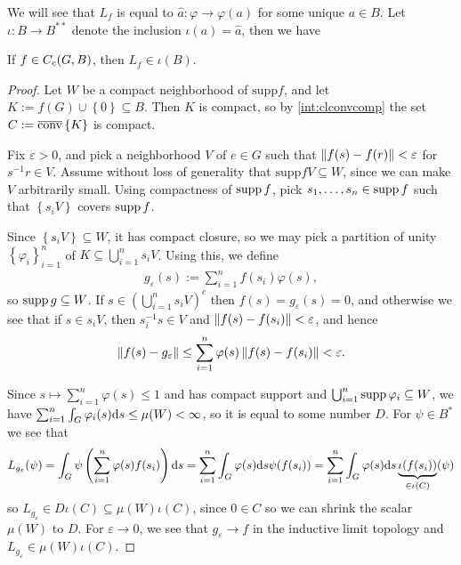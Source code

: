 We will see that $L_f$ is equal to $\hat a \colon \varphi \to \varphi(a)$ for some unique $a \in B$. Let $\iota \colon B \to B^{**}$ denote the inclusion $\iota(a) = \hat a$, then we have
\begin{lemma}
	If $f \in C_c(G,B)$, then $L_f \in \iota(B)$.
	\label{int:defintegral}
\end{lemma}
\begin{proof}
	Let $W$ be a compact neighborhood of $\mathrm{supp} f$, and let $K:= f(G) \cup \left\{ 0 \right\} \subseteq B$. Then $K$ is compact, so by \ref{int:clconvcomp} the set $C := \overline {\operatorname{conv}} \left\{ K \right\}$ is compact.

	Fix $\varepsilon > 0$, and pick a neighborhood $V$ of $e \in G$ such that $ \left\lVert f(s) - f(r) \right\rVert < \varepsilon$ for $s^{-1}r \in V$. Assume without loss of generality that $\mathrm{supp} f V \subseteq W$, since we can make $V$ arbitrarily small. Using compactness of $\operatorname{supp} f$, pick $s_1,\dots,s_n \in \operatorname{supp} f$ such that $\left\{ s_i V \right\}$ covers $\operatorname{supp} f$.
	
	Since $ \left\{ s_i V \right\} \subseteq W$, it has compact closure, so we may pick a partition of unity $\left\{ \varphi_i \right\}_{i=1}^n$ of $ K \subseteq \bigcup_{i=1}^n s_i V$. Using this, we define 
	\begin{align*}
		g_\varepsilon (s) := \sum_{i=1}^n f(s_i) \varphi(s),
	\end{align*}
	so $\operatorname{supp} g \subseteq W$. If $s \in \left( \bigcup_{i=1}^n s_i V \right)^c$ then $f(s) = g_{\varepsilon}(s) = 0$, and otherwise we see that if $s \in s_i V$, then $s_i^{-1}s \in V$ and $\left\lVert f(s) - f(s_i) \right\rVert < \varepsilon$, and hence
	\begin{align*}
		\left\lVert f(s) - g_{\varepsilon} \right\rVert  \leq \sum_{i=1}^n \varphi(s) \left\lVert f(s)-f(s_i) \right\rVert  < \varepsilon.
	\end{align*}

	Since $s \mapsto \sum_{i=1}^n \varphi(s) \leq 1$ and has compact support and $\bigcup_{i=1}^n \operatorname{supp} \varphi_i \subseteq W$, we have $\sum_{i=1}^n \int_G \varphi_i(s) \mathrm{d} s \leq \mu(W) < \infty$, so it is equal to some number $D$. For $\psi \in B^*$ we see that
	\begin{align*}
		L_{g_{\varepsilon}} ( \psi ) = \int_{G} \psi\left( \sum_{i=1}^n \varphi(s) f(s_i) \right) \mathrm{d} s = \sum_{i=1}^n \int_G \varphi(s) \mathrm{d} s \psi(f(s_i)) = \sum_{i=1}^n \int_G \varphi(s) \mathrm{d} s \underbrace{\iota(f(s_i))}_{ \in \iota(C)} (\psi) 
	\end{align*}
	so $L_{g_{\varepsilon}}  \in D \iota(C) \subseteq \mu(W) \iota(C)$, since $0 \in C$ so we can shrink the scalar $\mu(W)$ to $D$. For $\varepsilon \to 0$, we see that $g_{\varepsilon} \to f$ in the inductive limit topology and $L_{g_\varepsilon} \in \mu(W) \iota(C)$. 


\end{proof}
